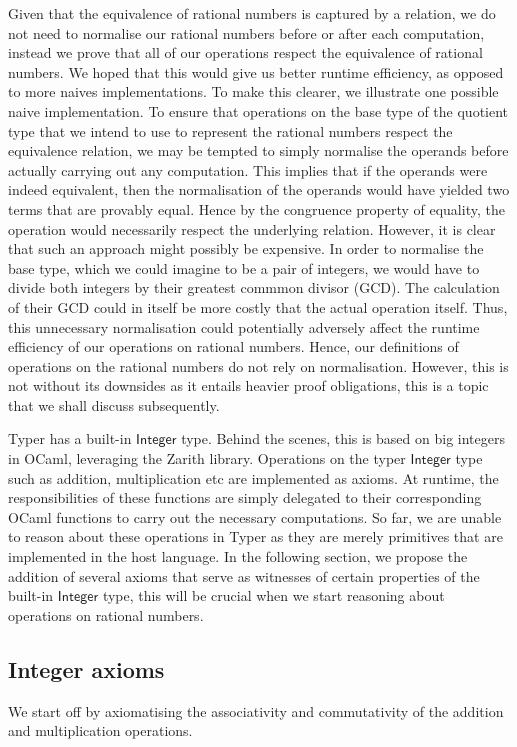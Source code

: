 \documentclass[12pt,twoside,maitrise]{dms}
\theoremstyle{definition}
\numberwithin{equation}{section}
\numberwithin{table}{chapter}
\numberwithin{figure}{chapter}
\newcommand\kw[1] {\textsf{#1}}
\begin{document}
Given that the equivalence of rational numbers is captured by a relation, we do
not need to normalise our rational numbers before or after each computation,
instead we prove that all of our operations respect the equivalence of rational
numbers. We hoped that this would give us better runtime efficiency, as opposed
to more naives implementations. To make this clearer, we illustrate one possible
naive implementation. To ensure that operations on the base type of the quotient
type that we intend to use to represent the rational numbers respect the
equivalence relation, we may be tempted to simply normalise the operands before
actually carrying out any computation. This implies that if the operands were
indeed equivalent, then the normalisation of the operands would have yielded two
terms that are provably equal. Hence by the congruence property of equality, the
operation would necessarily respect the underlying relation. However, it is
clear that such an approach might possibly be expensive. In order to normalise
the base type, which we could imagine to be a pair of integers, we would have to
divide both integers by their greatest commmon divisor (GCD). The calculation of
their GCD could in itself be more costly that the actual operation itself. Thus,
this unnecessary normalisation could potentially adversely affect the runtime
efficiency of our operations on rational numbers. Hence, our definitions of
operations on the rational numbers do not rely on normalisation. However, this
is not without its downsides as it entails heavier proof obligations, this is a
topic that we shall discuss subsequently.

Typer has a built-in $\kw{Integer}$ type. Behind the scenes, this is based on
big integers in OCaml, leveraging the Zarith library. Operations on the typer
$\kw{Integer}$ type such as addition, multiplication etc are implemented as
axioms. At runtime, the responsibilities of these functions are simply delegated
to their corresponding OCaml functions to carry out the necessary computations.
So far, we are unable to reason about these operations in Typer as they are
merely primitives that are implemented in the host language. In the following
section, we propose the addition of several axioms that serve as witnesses of
certain properties of the built-in $\kw{Integer}$ type, this will be crucial
when we start reasoning about operations on rational numbers.

\subsection*{Integer axioms}
We start off by axiomatising the associativity and commutativity of the addition and multiplication operations.
\end{document}
